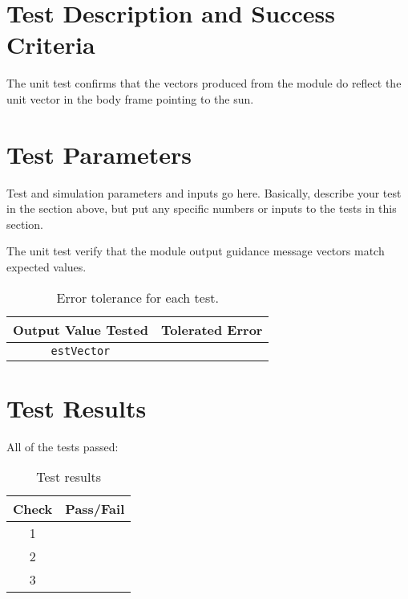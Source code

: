 
\section{Test Description and Success Criteria}
The unit test confirms that the vectors produced from the module do reflect the unit vector in the body frame pointing to the sun. 


\section{Test Parameters}

Test and simulation parameters and inputs go here. Basically, describe your test in the section above, but put any specific numbers or inputs to the tests in this section.

The unit test verify that the module output guidance message vectors match expected values.
\begin{table}[htbp]
	\caption{Error tolerance for each test.}
	\label{tab:errortol}
	\centering \fontsize{10}{10}\selectfont
	\begin{tabular}{ c | c } %
		\hline\hline
		\textbf{Output Value Tested}  & \textbf{Tolerated Error}  \\ 
		\hline
		{\tt estVector}        & 	   \\ 
		\hline\hline
	\end{tabular}
\end{table}




\section{Test Results}


All of the tests passed:
\begin{table}[H]
	\caption{Test results}
	\label{tab:results}
	\centering \fontsize{10}{10}\selectfont
	\begin{tabular}{c | c  } %
		\hline\hline
		\textbf{Check} 						  		&\textbf{Pass/Fail} \\ 
		\hline
	   1	   			&  \\ 
	   2	   			&  \\ 
	   3	   			&  \\ 
	   \hline\hline
	\end{tabular}
\end{table}




